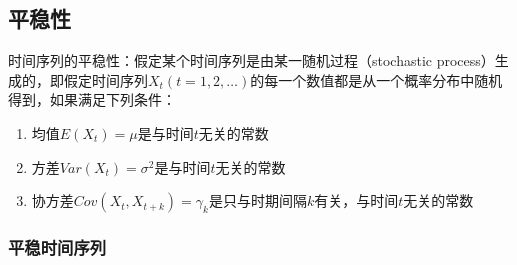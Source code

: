 \documentclass[12pt]{book}
\begin{document}
\subsection{平稳性}







时间序列的平稳性：假定某个时间序列是由某一随机过程（stochastic process）生成的，即假定时间序列${X_t}(t=1,2,…)$的每一个数值都是从一个概率分布中随机得到，如果满足下列条件：
\begin{enumerate}[(1)]
    \item 均值$E(X_t)=\mu$是与时间$t$无关的常数  
    \item 方差$Var(X_t)=\sigma^2$是与时间$t$无关的常数  
    \item 协方差$Cov\left(X_t,X_{t+k}\right)=\gamma_k$是只与时期间隔$k$有关，与时间$t$无关的常数
\end{enumerate}


\subsubsection{平稳时间序列}
\end{document}
